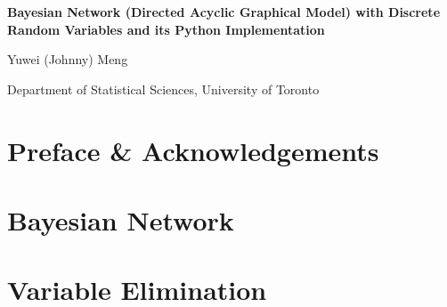 \documentclass{article}
\title{\assignmentname}
\author{Yuwei (Johnny) Meng}
\date{\duedate}
\begin{document}
\begin{titlepage}
    \centering
    \vspace*{3cm}
    {\huge \bfseries Bayesian Network (Directed Acyclic Graphical Model) with Discrete Random Variables and its Python Implementation \par}
    \vspace{5cm}
    {\Large Yuwei (Johnny) Meng \par}
    \vspace{3cm}
    {\large Department of Statistical Sciences, University of Toronto}
    \vfill
\end{titlepage}

\tableofcontents

\pagebreak

\section{Preface \& Acknowledgements}

\pagebreak

\section{Bayesian Network}

\pagebreak

\section{Variable Elimination}
\end{document}

